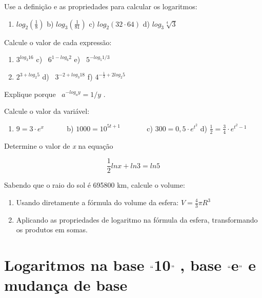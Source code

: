 \begin{exercicios}
	\exitem{} Use a definição e as propriedades para calcular os logaritmos:
    \begin{enumerate}
	    \item  \( log_{2} \left( \frac{1}{8} \right)  \) \quad \quad b)  \( log_{3} \left( \frac{1}{81} \right)  \) \quad \quad c)  \( log_{2} \left( 32 \cdot 64 \right)  \) \quad d)  \( log_{3}\sqrt[4]{3} \)  
    \end{enumerate}

	\exitem{} Calcule o valor de cada expressão:
    \begin{enumerate}
	    \item  \( 3^{log_{3}16} \) \quad \quad c)~  \( 6^{1-log_{6}2} \) \quad \quad e)~  \( 5^{-log_{5}1/3} \) 

	    \item  \( 2^{3+log_{2}5} \) \quad \quad d)~  \( 3^{-2+log_{3}18} \) \quad \quad f)  \( 4^{-\frac{1}{2}+2log_{2}5} \) 
    \end{enumerate}

    \exitem{} Explique porque~  \( a^{-log_{a}y}=1/y \) .

    \exitem{} Calcule o valor da variável:

    \begin{enumerate}
	    \item  \( 9=3 \cdot e^{x} \) \quad ~~~~~ b)  \( 1000=10^{5t+1} \) ~~~~~~ c)  \( 300=0,5 \cdot e^{t^{2}} \) \quad d) \( \frac{1}{2}=\frac{3}{4} \cdot e^{t^{2}-1} \) 
    \end{enumerate}

	\exitem{} Determine o valor de \textit{x} na equação

    $$\frac{1}{2}ln x+ln3=ln5$$ 

	\exitem{} Sabendo que o raio do sol é 695800 km, calcule o volume:

    \begin{enumerate}
	    \item Usando diretamente a fórmula do volume da esfera:  \( V=\frac{4}{3} \pi R^{3} \)  

	    \item Aplicando as propriedades de logaritmo na fórmula da esfera, transformando os produtos em somas.
    \end{enumerate}
\end{exercicios}

\section{Logaritmos na base $``$10$"$  , base $``$e$"$  e mudança de base}

